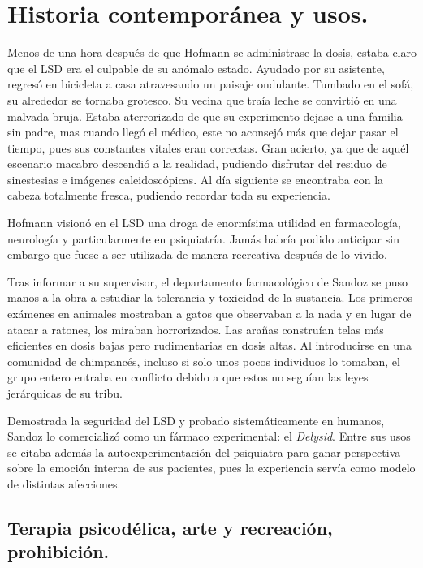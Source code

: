 \section{Historia contemporánea y usos.} \label{now-history}

Menos de una hora después de que Hofmann se administrase la dosis, estaba claro que el LSD era el culpable de su anómalo estado. Ayudado por su asistente, regresó en bicicleta a casa atravesando un paisaje ondulante. Tumbado en el sofá, su alrededor se tornaba grotesco. Su vecina que traía leche se convirtió en una malvada bruja. Estaba aterrorizado de que su experimento dejase a una familia sin padre, mas cuando llegó el médico, este no aconsejó más que dejar pasar el tiempo, pues sus constantes vitales eran correctas. Gran acierto, ya que de aquél escenario macabro descendió a la realidad, pudiendo disfrutar del residuo de sinestesias e imágenes caleidoscópicas. Al día siguiente se encontraba con la cabeza totalmente fresca, pudiendo recordar toda su experiencia.

Hofmann visionó en el LSD una droga de enormísima utilidad en farmacología, neurología y particularmente en psiquiatría. Jamás habría podido anticipar sin embargo que fuese a ser utilizada de manera recreativa después de lo vivido.

Tras informar a su supervisor, el departamento farmacológico de Sandoz se puso manos a la obra a estudiar la tolerancia y toxicidad de la sustancia. Los primeros exámenes en animales mostraban a gatos que observaban a la nada y en lugar de atacar a ratones, los miraban horrorizados. Las arañas construían telas más eficientes en dosis bajas pero rudimentarias en dosis altas. Al introducirse en una comunidad de chimpancés, incluso si solo unos pocos individuos lo tomaban, el grupo entero entraba en conflicto debido a que estos no seguían las leyes jerárquicas de su tribu.

Demostrada la seguridad del LSD y probado sistemáticamente en humanos, Sandoz lo comercializó como un fármaco experimental: el \textit{Delysid}. Entre sus usos se citaba además la autoexperimentación del psiquiatra para ganar perspectiva sobre la emoción interna de sus pacientes, pues la experiencia servía como modelo de distintas afecciones.

\subsection{Terapia psicodélica, arte y recreación, prohibición.}

